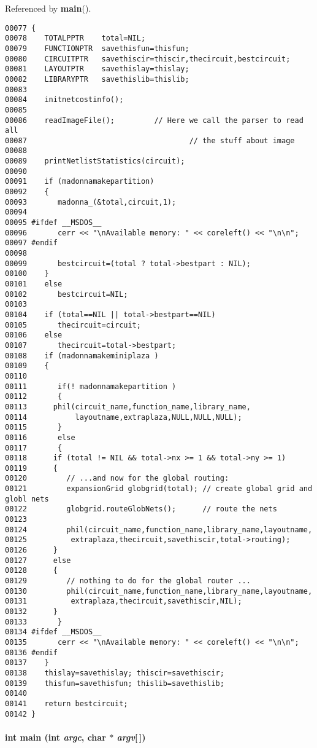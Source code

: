 Referenced by {\bf main}().\small\begin{verbatim}00077 {
00078    TOTALPPTR    total=NIL;
00079    FUNCTIONPTR  savethisfun=thisfun;
00080    CIRCUITPTR   savethiscir=thiscir,thecircuit,bestcircuit;
00081    LAYOUTPTR    savethislay=thislay;
00082    LIBRARYPTR   savethislib=thislib;
00083    
00084    initnetcostinfo();
00085 
00086    readImageFile();         // Here we call the parser to read all 
00087                                     // the stuff about image
00088    
00089    printNetlistStatistics(circuit);
00090 
00091    if (madonnamakepartition)
00092    {
00093       madonna_(&total,circuit,1);
00094 
00095 #ifdef __MSDOS__
00096       cerr << "\nAvailable memory: " << coreleft() << "\n\n";
00097 #endif
00098 
00099       bestcircuit=(total ? total->bestpart : NIL);
00100    }
00101    else
00102       bestcircuit=NIL;
00103 
00104    if (total==NIL || total->bestpart==NIL)
00105       thecircuit=circuit;
00106    else
00107       thecircuit=total->bestpart;
00108    if (madonnamakeminiplaza )
00109    {
00110 
00111       if(! madonnamakepartition )
00112       {
00113      phil(circuit_name,function_name,library_name,
00114           layoutname,extraplaza,NULL,NULL,NULL);
00115       }
00116       else
00117       {
00118      if (total != NIL && total->nx >= 1 && total->ny >= 1)
00119      {
00120         // ...and now for the global routing:
00121         expansionGrid globgrid(total); // create global grid and globl nets
00122         globgrid.routeGlobNets();      // route the nets
00123 
00124         phil(circuit_name,function_name,library_name,layoutname,
00125          extraplaza,thecircuit,savethiscir,total->routing);
00126      }
00127      else
00128      {
00129         // nothing to do for the global router ...
00130         phil(circuit_name,function_name,library_name,layoutname,
00131          extraplaza,thecircuit,savethiscir,NIL);
00132      }
00133       }
00134 #ifdef __MSDOS__
00135       cerr << "\nAvailable memory: " << coreleft() << "\n\n";
00136 #endif
00137    }
00138    thislay=savethislay; thiscir=savethiscir;
00139    thisfun=savethisfun; thislib=savethislib;
00140    
00141    return bestcircuit;
00142 }
\end{verbatim}\normalsize 
\label{main.C_a15}
\paragraph{\setlength{\rightskip}{0pt plus 5cm}int main (int {\em argc}, char $\ast$ {\em argv}[$\,$])}\hfill



